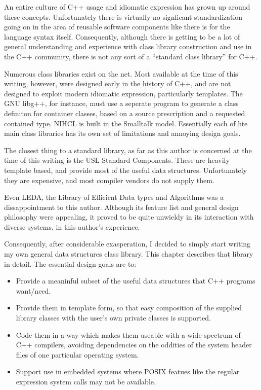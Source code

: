 An entire culture of C++ usage and idiomatic expression has grown up
around these concepts.  Unfortunately there is virtually no
signficant standardization going on in the area of reusable software
components like there is for the language syntax itself.
Consequently, although there is getting to be a lot of general
understanding and experience with class library construction and use
in the C++ community, there is not any sort of a ``standard class
library'' for C++.

Numerous class libraries exist on the net.  Most available at the time
of this writing, however, were designed early in the history of C++,
and are not designed to exploit modern idiomatic expression,
particularly templates.  The GNU libg++, for instance, must use a
seperate program to generate a class definiton for container classes,
based on a source prescription and a requested contained type.  NIHCL
is built in the Smalltalk model.  Essentially each of hte main class
libraries has its own set of limitations and annoying design goals.

The closest thing to a standard library, as far as this author is
concerned at the time of this writing is the USL Standard Components.
These are heavily template based, and provide most of the useful data
structures.  Unfortunately they are expensive, and most compiler
vendors do not supply them.

Even LEDA, the Library of Efficient Data types and Algorithms was a
dissappointment to this author.  Although its feature list and general
design philosophy were appealing, it proved to be quite unwieldy in
its interaction with diverse systems, in this author's experience.

Consequently, after considerable exasperation, I decided to simply
start writing my own general data structures class library.  This
chapter describes that library in detail.  The essential design goals
are to:
\begin{itemize}

\item	Provide a meaninful subset of the useful data structures that
C++ programs want/need.

\item	Provide them in template form, so that easy composition of the
supplied library classes with the user's own private classes is
supported. 

\item	Code them in a way which makes them useable with a wide
spectrum of C++ compilers, avoiding dependencies on the oddities of
the system header files of one particular operating system.

\item	Support use in embedded systems where POSIX featues like the
regular expression system calls may not be available.
\end{itemize}

